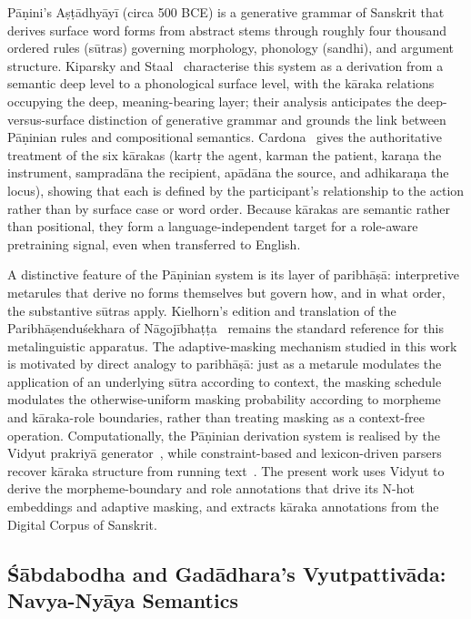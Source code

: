 Pāṇini's Aṣṭādhyāyī (circa 500 BCE) is a generative grammar of Sanskrit that derives surface word forms from abstract stems through roughly four thousand ordered rules (sūtras) governing morphology, phonology (sandhi), and argument structure. Kiparsky and Staal~\cite{KiparskyStaal1969} characterise this system as a derivation from a semantic deep level to a phonological surface level, with the kāraka relations occupying the deep, meaning-bearing layer; their analysis anticipates the deep-versus-surface distinction of generative grammar and grounds the link between Pāṇinian rules and compositional semantics. Cardona~\cite{Cardona1974Karaka} gives the authoritative treatment of the six kārakas (kartṛ the agent, karman the patient, karaṇa the instrument, sampradāna the recipient, apādāna the source, and adhikaraṇa the locus), showing that each is defined by the participant's relationship to the action rather than by surface case or word order. Because kārakas are semantic rather than positional, they form a language-independent target for a role-aware pretraining signal, even when transferred to English.

A distinctive feature of the Pāṇinian system is its layer of paribhāṣā: interpretive metarules that derive no forms themselves but govern how, and in what order, the substantive sūtras apply. Kielhorn's edition and translation of the Paribhāṣenduśekhara of Nāgojībhaṭṭa~\cite{Kielhorn1868Paribhasa} remains the standard reference for this metalinguistic apparatus. The adaptive-masking mechanism studied in this work is motivated by direct analogy to paribhāṣā: just as a metarule modulates the application of an underlying sūtra according to context, the masking schedule modulates the otherwise-uniform masking probability according to morpheme and kāraka-role boundaries, rather than treating masking as a context-free operation. Computationally, the Pāṇinian derivation system is realised by the Vidyut prakriyā generator~\cite{Prasad2024Vidyut}, while constraint-based and lexicon-driven parsers recover kāraka structure from running text~\cite{Kulkarni2010Parser, Goyal2016Sanskrit}. The present work uses Vidyut to derive the morpheme-boundary and role annotations that drive its N-hot embeddings and adaptive masking, and extracts kāraka annotations from the Digital Corpus of Sanskrit.

\subsection{Śābdabodha and Gadādhara's Vyutpattivāda: Navya-Nyāya Semantics}

